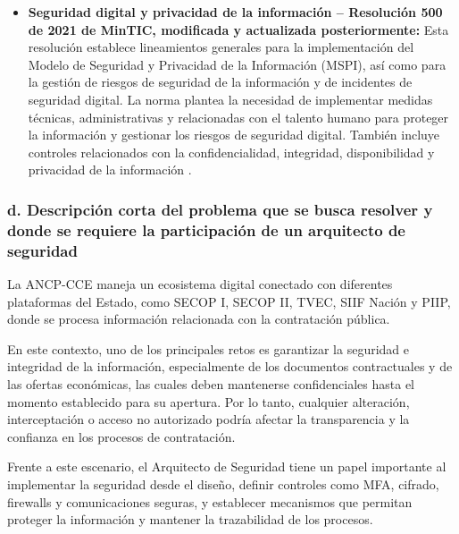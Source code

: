 \begin{itemize}
    \item \textbf{Seguridad digital y privacidad de la información -- Resolución 500 de 2021 de MinTIC, modificada y actualizada posteriormente:} Esta resolución establece lineamientos generales para la implementación del Modelo de Seguridad y Privacidad de la Información (MSPI), así como para la gestión de riesgos de seguridad de la información y de incidentes de seguridad digital. La norma plantea la necesidad de implementar medidas técnicas, administrativas y relacionadas con el talento humano para proteger la información y gestionar los riesgos de seguridad digital. También incluye controles relacionados con la confidencialidad, integridad, disponibilidad y privacidad de la información \parencite{mintic2021}.


\end{itemize}


\subsubsection{d. Descripción corta del problema que se busca resolver y donde se requiere la participación de un arquitecto de seguridad}
La ANCP-CCE maneja un ecosistema digital conectado con diferentes plataformas del Estado, como SECOP I, SECOP II, TVEC, SIIF Nación y PIIP, donde se procesa información relacionada con la contratación pública.

En este contexto, uno de los principales retos es garantizar la seguridad e integridad de la información, especialmente de los documentos contractuales y de las ofertas económicas, las cuales deben mantenerse confidenciales hasta el momento establecido para su apertura. Por lo tanto, cualquier alteración, interceptación o acceso no autorizado podría afectar la transparencia y la confianza en los procesos de contratación.

Frente a este escenario, el Arquitecto de Seguridad tiene un papel importante al implementar la seguridad desde el diseño, definir controles como MFA, cifrado, firewalls y comunicaciones seguras, y establecer mecanismos que permitan proteger la información y mantener la trazabilidad de los procesos.
